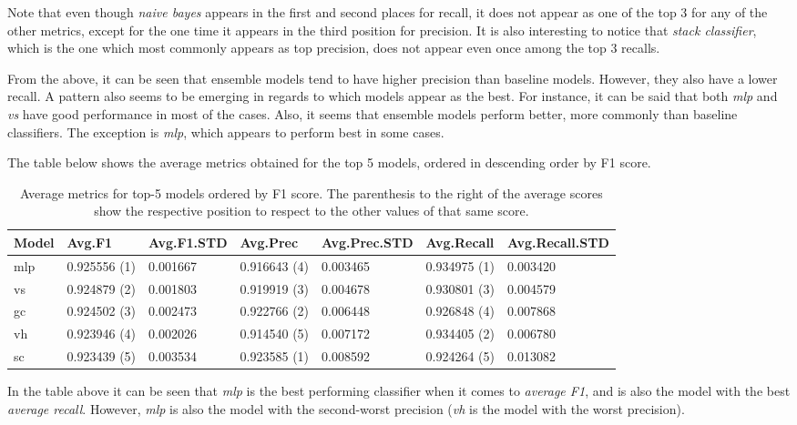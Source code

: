 \documentclass[epsfig,a4paper,11pt,titlepage,twoside,openany]{book}
\begin{document}
Note that even though \textit{naive bayes} appears in the first and second places for recall, it does not appear as one of the top 3 for any of the other metrics, except for the one time it appears in the third position for precision. It is also interesting to notice that \textit{stack classifier}, which is the one which most commonly appears as top precision, does not appear even once among the top 3 recalls.

From the above, it can be seen that ensemble models tend to have higher precision than baseline models. However, they also have a lower recall. A pattern also seems to be emerging in regards to which models appear as the best. For instance, it can be said that both \textit{mlp} and \textit{vs} have good performance in most of the cases. Also, it seems that ensemble models perform better, more commonly than baseline classifiers. The exception is \textit{mlp}, which appears to perform best in some cases.

The table below shows the average metrics obtained for the top 5 models, ordered in descending order by F1 score. 

\begin{table}[H]
\centering
\begin{tabular}{l|l|l|l|l|l|l}
Model & Avg.F1       & Avg.F1.STD & Avg.Prec     & Avg.Prec.STD & Avg.Recall   & Avg.Recall.STD \\ \hline
mlp   & 0.925556 (1) & 0.001667   & 0.916643 (4) & 0.003465     & 0.934975 (1) & 0.003420       \\
vs    & 0.924879 (2) & 0.001803   & 0.919919 (3) & 0.004678     & 0.930801 (3) & 0.004579       \\
gc    & 0.924502 (3) & 0.002473   & 0.922766 (2) & 0.006448     & 0.926848 (4) & 0.007868       \\
vh    & 0.923946 (4) & 0.002026   & 0.914540 (5) & 0.007172     & 0.934405 (2) & 0.006780       \\
sc    & 0.923439 (5) & 0.003534   & 0.923585 (1) & 0.008592     & 0.924264 (5) & 0.013082      
\end{tabular}
\caption{Average metrics for top-5 models ordered by F1 score. The parenthesis to the right of the average scores show the respective position to respect to the other values of that same score. }
\label{tab:comparison-average-all-models}
\end{table}

In the table above it can be seen that \textit{mlp} is the best performing classifier when it comes to \textit{average F1}, and is also the model with the best \textit{average recall}. However, \textit{mlp} is also the model with the second-worst precision (\textit{vh} is the model with the worst precision). 
 
\end{document}
